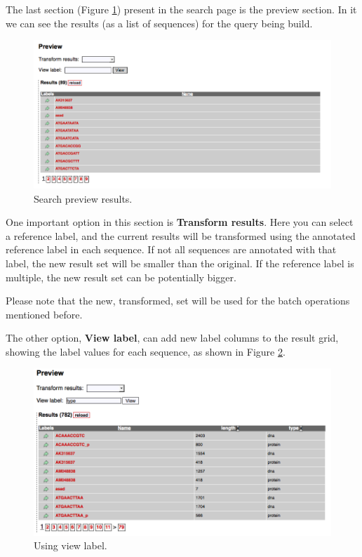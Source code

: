 The last section (Figure \ref{fig:search3_man}) present in the search page is the preview section. In it
we can see the results (as a list of sequences) for the query being build.

\begin{figure}[H]
  \centering
    \includegraphics[scale=0.5]{search3.png}
  \caption{Search preview results.}
  \label{fig:search3_man}
\end{figure}

One important option in this section is \textbf{Transform results}. Here you can select a reference label,
and the current results will be transformed using the annotated reference label in each sequence.
If not all sequences are annotated with that label, the new result set will be smaller than the original.
If the reference label is multiple, the new result set can be potentially bigger.

Please note that the new, transformed, set will be used for the batch operations mentioned before.

The other option, \textbf{View label}, can add new label columns to the result grid, showing the label
values for each sequence, as shown in Figure \ref{fig:view_label}.

\begin{figure}[H]
  \centering
    \includegraphics[scale=0.5]{view_label.png}
  \caption{Using view label.}
  \label{fig:view_label}
\end{figure}

